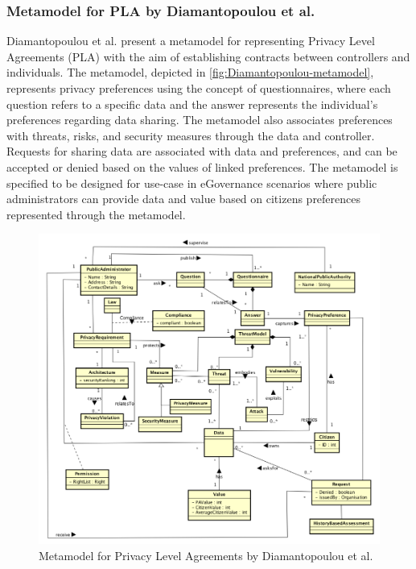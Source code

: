 \subsubsection{Metamodel for PLA by Diamantopoulou et al.}
Diamantopoulou et al. present a metamodel for representing Privacy Level Agreements (PLA) with the aim of establishing contracts between controllers and individuals.
The metamodel, depicted in \autoref{fig:Diamantopoulou-metamodel}, represents privacy preferences using the concept of questionnaires, where each question refers to a specific data and the answer represents the individual's preferences regarding data sharing. The metamodel also associates preferences with threats, risks, and security measures through the data and controller. Requests for sharing data are associated with data and preferences, and can be accepted or denied based on the values of linked preferences.
The metamodel is specified to be designed for use-case in eGovernance scenarios where public administrators can provide data and value based on citizens preferences represented through the metamodel.
\begin{figure}[htbp]
    \centering
    \includegraphics[width=0.8\linewidth]{img/Diamantopoulou_metamodel.png}
    \caption{Metamodel for Privacy Level Agreements by Diamantopoulou et al. \cite{diamantopoulou_metamodel_2017}}
    \label{fig:Diamantopoulou-metamodel}
\end{figure}

